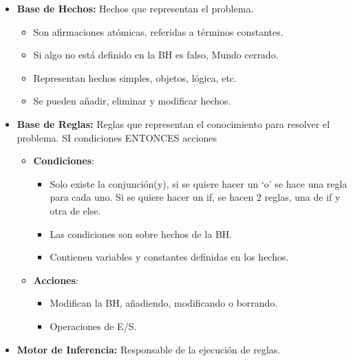\documentclass[12pt, twoside, openright]{report} %
\begin{document}
  \begin{itemize}
  \item \textbf{Base de Hechos:} Hechos que representan el problema.
    

    \begin{itemize}
    \item Son afirmaciones atómicas, referidas a términos constantes.
      
    \item Si algo no está definido en la BH es falso, Mundo cerrado.
      
    \item Representan hechos simples, objetos, lógica, etc.
      
    \item Se pueden añadir, eliminar y modificar hechos.
      
    \end{itemize}
  \item \textbf{Base de Reglas:} Reglas que representan el conocimiento para
    resolver el problema. SI condiciones ENTONCES acciones
    

    \begin{itemize}
    \item \textbf{Condiciones}:
      

      \begin{itemize}
      \item Solo existe la conjunción(y), si se quiere hacer un `o' se hace
        una regla para cada uno. Si se quiere hacer un if, se hacen 2
        reglas, una de if y otra de else.
        
      \item Las condiciones son sobre hechos de la BH.
        
      \item Contienen variables y constantes definidas en los hechos.
        
      \end{itemize}
    \item \textbf{Acciones}:
      

      \begin{itemize}
      \item Modifican la BH, añadiendo, modificando o borrando.
        
      \item Operaciones de E/S.
        
      \end{itemize}
    \end{itemize}
  \item \textbf{Motor de Inferencia:} Responsable de la ejecución de reglas.
    


\end{itemize}
\end{document}
